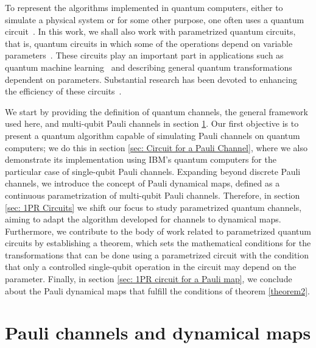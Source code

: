 \documentclass[10pt,letterpaper]{article} %
\begin{document}
To represent the algorithms implemented in quantum computers, either to
simulate a physical system or for some other purpose, one often uses a quantum
circuit~\cite{chuangbook}.  In this work, we shall also work with parametrized
quantum circuits, that is,  quantum circuits in which some of the operations
depend on variable parameters~\cite{cerezo}.  These circuits play an important
part in applications such as quantum machine learning~\cite{Benedetti} and
describing general quantum transformations dependent on parameters. Substantial
research has been devoted to enhancing the efficiency of these
circuits~\cite{Watanabe,Rasmussen}. 

We start by providing the definition of quantum channels, the general framework
used here, and multi-qubit Pauli channels in section \ref{sec: Pauli Channels}.
Our first objective is to present a quantum algorithm capable of simulating
Pauli channels on quantum computers; we do this in section \ref{sec: Circuit
for a Pauli Channel}, where we also demonstrate its implementation using IBM's
quantum computers for the particular case of single-qubit Pauli channels. 
Expanding beyond discrete Pauli channels, we introduce the concept of Pauli
dynamical maps, defined as a continuous parametrization of multi-qubit Pauli
channels.  Therefore, in section \ref{sec: 1PR Circuits} we shift our focus to
study parametrized quantum channels, aiming to adapt the algorithm developed
for channels to dynamical maps.  Furthermore, we contribute to the body of work
related to parametrized quantum circuits by establishing a theorem,
which  sets the mathematical conditions for the transformations
that can be done using a parametrized circuit with the condition that only a
controlled single-qubit
operation in the circuit may depend on the parameter.  Finally, in
section \ref{sec: 1PR circuit for a Pauli map}, we conclude about the Pauli
dynamical maps that fulfill the conditions of theorem \ref{theorem2}. 

\section{Pauli channels and dynamical maps}  \label{sec: Pauli Channels} %

\end{document}
